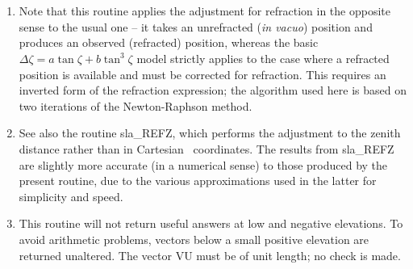 {
}
{
  \\
  \\
}
{
}
\notes
{
 \begin{enumerate}
  \item Note that this routine applies the adjustment for refraction in
        the opposite sense to the usual one -- it takes an unrefracted
        ({\it in vacuo}) position and produces an observed (refracted)
        position, whereas the basic
        $\Delta \zeta = a \tan \zeta + b \tan^{3} \zeta$ 
        model strictly
        applies to the case where a refracted position is available and
        must be corrected for refraction.  This requires an inverted form of
        the refraction expression;  the algorithm used here is based on
        two iterations of the Newton-Raphson method.
  \item See also the routine sla\_REFZ, which performs the adjustment to
        the zenith distance rather than in Cartesian \azel\ coordinates.
        The results from sla\_REFZ are slightly more accurate (in a
        numerical sense) to those produced by the present routine, due to
        the various approximations used in the latter for simplicity and
        speed.
  \item This routine will not return useful answers at low and negative
        elevations.  To avoid arithmetic problems, vectors below a small
        positive elevation are returned unaltered.  The vector VU must be
        of unit length;  no check is made.
 \end{enumerate}
}
{
}
{
  \\
  \\
}

